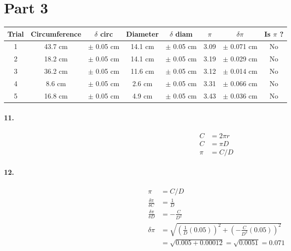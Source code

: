     \section*{Part 3}

    \begin{center}
        \begin{tabular}{| c | c | c | c | c | c | c | c |}
            \hline
            Trial & Circumference & $\delta$ circ & Diameter & $\delta$ diam & $\pi$ & $\delta \pi$ & Is $ \pi $ ? \\
            \hline
            1 & 43.7 cm & $\pm$ 0.05 cm & 14.1 cm & $\pm$ 0.05 cm & 3.09 & $\pm$ 0.071 cm & No \\
            \hline
            2 & 18.2 cm & $\pm$ 0.05 cm & 14.1 cm & $\pm$ 0.05 cm & 3.19 & $\pm$ 0.029 cm & No \\ 
            \hline
            3 & 36.2 cm & $\pm$ 0.05 cm & 11.6 cm & $\pm$ 0.05 cm & 3.12 & $\pm$ 0.014 cm & No \\ 
            \hline
            4 & 8.6 cm & $\pm$ 0.05 cm & 2.6 cm & $\pm$ 0.05 cm & 3.31 & $\pm$ 0.066 cm & No \\ 
            \hline
            5 & 16.8 cm & $\pm$ 0.05 cm & 4.9 cm & $\pm$ 0.05 cm & 3.43 & $\pm$ 0.036 cm & No \\ 
            \hline
        \end{tabular}
    \end{center}

    \paragraph*{11.}

    \begin{align*}
        C       & = 2\pi r  \\
        C       & = \pi D   \\
        \pi     & = C / D
    \end{align*}

    \paragraph*{12.}
    \begin{align*}
        \pi                         & = C / D               \\
        \frac{\delta \pi}{\delta C} & = \frac{1}{D}         \\
        \frac{\delta \pi}{\delta D} & = -\frac{C}{D^2}      \\
        \delta \pi                  & = \sqrt{\left(\frac{1}{D}(0.05)\right)^2 + \left(-\frac{C}{D^2}(0.05)\right)^2}   \\
                                    & = \sqrt{0.005 + 0.00012} = \sqrt{0.0051} = \boxed{0.071}
    \end{align*}

